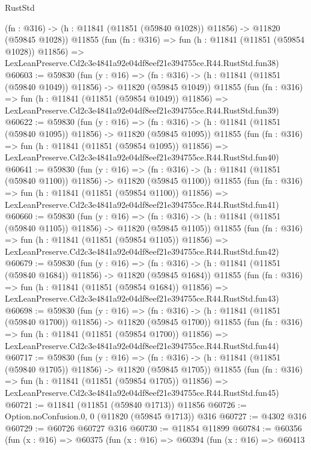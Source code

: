 \begin{lexlean}{RustStd}
\begin{coremodule}
    (fn : @316) -> (h : @11841 (@11851 (@59840 @1028)) @11856) -> @11820 (@59845 @1028))
    @11855
    (fun (fn : @316) =>
    fun (h : @11841 (@11851 (@59854 @1028)) @11856) =>
    LexLeanPreserve.Cd2c3e4841a92e04df8eef21e394755ce.R44.RustStd.fun38)
@60603 := @59830
    (fun (y : @16) =>
    (fn : @316) -> (h : @11841 (@11851 (@59840 @1049)) @11856) -> @11820 (@59845 @1049))
    @11855
    (fun (fn : @316) =>
    fun (h : @11841 (@11851 (@59854 @1049)) @11856) =>
    LexLeanPreserve.Cd2c3e4841a92e04df8eef21e394755ce.R44.RustStd.fun39)
@60622 := @59830
    (fun (y : @16) =>
    (fn : @316) -> (h : @11841 (@11851 (@59840 @1095)) @11856) -> @11820 (@59845 @1095))
    @11855
    (fun (fn : @316) =>
    fun (h : @11841 (@11851 (@59854 @1095)) @11856) =>
    LexLeanPreserve.Cd2c3e4841a92e04df8eef21e394755ce.R44.RustStd.fun40)
@60641 := @59830
    (fun (y : @16) =>
    (fn : @316) -> (h : @11841 (@11851 (@59840 @1100)) @11856) -> @11820 (@59845 @1100))
    @11855
    (fun (fn : @316) =>
    fun (h : @11841 (@11851 (@59854 @1100)) @11856) =>
    LexLeanPreserve.Cd2c3e4841a92e04df8eef21e394755ce.R44.RustStd.fun41)
@60660 := @59830
    (fun (y : @16) =>
    (fn : @316) -> (h : @11841 (@11851 (@59840 @1105)) @11856) -> @11820 (@59845 @1105))
    @11855
    (fun (fn : @316) =>
    fun (h : @11841 (@11851 (@59854 @1105)) @11856) =>
    LexLeanPreserve.Cd2c3e4841a92e04df8eef21e394755ce.R44.RustStd.fun42)
@60679 := @59830
    (fun (y : @16) =>
    (fn : @316) -> (h : @11841 (@11851 (@59840 @1684)) @11856) -> @11820 (@59845 @1684))
    @11855
    (fun (fn : @316) =>
    fun (h : @11841 (@11851 (@59854 @1684)) @11856) =>
    LexLeanPreserve.Cd2c3e4841a92e04df8eef21e394755ce.R44.RustStd.fun43)
@60698 := @59830
    (fun (y : @16) =>
    (fn : @316) -> (h : @11841 (@11851 (@59840 @1700)) @11856) -> @11820 (@59845 @1700))
    @11855
    (fun (fn : @316) =>
    fun (h : @11841 (@11851 (@59854 @1700)) @11856) =>
    LexLeanPreserve.Cd2c3e4841a92e04df8eef21e394755ce.R44.RustStd.fun44)
@60717 := @59830
    (fun (y : @16) =>
    (fn : @316) -> (h : @11841 (@11851 (@59840 @1705)) @11856) -> @11820 (@59845 @1705))
    @11855
    (fun (fn : @316) =>
    fun (h : @11841 (@11851 (@59854 @1705)) @11856) =>
    LexLeanPreserve.Cd2c3e4841a92e04df8eef21e394755ce.R44.RustStd.fun45)
@60721 := @11841 (@11851 (@59840 @1713)) @11856
@60726 := Option.noConfusion.{0, 0} (@11820 (@59845 @1713)) @316
@60727 := @4302 @316
@60729 := @60726 @60727 @316
@60730 := @11854 @11899
@60784 := @60356
    (fun (x : @16) =>
    @60375
      (fun (x : @16) =>
      @60394
        (fun (x : @16) =>
        @60413

\end{coremodule}
\end{lexlean}
